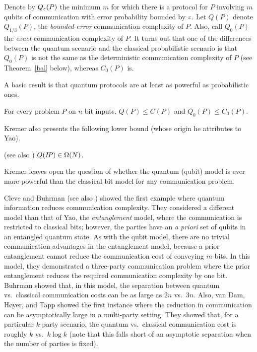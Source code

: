 Denote by $Q_{\varepsilon}(P)$ the minimum $m$ for which there is a protocol for 
$P$ involving $m$ qubits of communication with error probability bounded 
by $\varepsilon$.
Let $Q(P)$ denote $Q_{1/3}(P)$, the {\em bounded-error} communication 
complexity of $P$.
Also, call $Q_0(P)$ the {\em exact} communication complexity of $P$.
It turns out that one of the differences between the quantum scenario 
and the classical probabilistic scenario is that $Q_0(P)$ is not the 
same as the deterministic communication complexity of $P$ (see 
Theorem~\ref{bal} below), whereas $C_0(P)$ is.

A basic result is that quantum protocols are at least as powerful as 
probabilistic ones.

\begin{fact}\cite{Kr95} For every problem $P$ on $n$-bit inputs,
$Q(P) \leq C(P)$ and $Q_0(P) \leq C_0(P)$.
\end{fact}

\ni Kremer also presents the following lower bound (whose origin he 
attributes to Yao).

\begin{theorem}\cite{Kr95} (see also \cite{CDNT97}) \label{thm:lowerboundip}
$Q(\mbox{\it IP\/}) \in \Omega(N)$.
\end{theorem}

\ni Kremer leaves open the question of whether the quantum (qubit) model 
is ever more powerful than the classical bit model for any communication 
problem.

Cleve and Buhrman \cite{CB97} (see also \cite{BCD97}) showed the first example 
where quantum information reduces communication complexity.
They considered a different model than that of Yao, the {\em entanglement\/} 
model, where the communication is restricted to classical bits; however, the 
parties have an {\em a priori} set of qubits in an entangled quantum state.
As with the qubit model, there are no trivial communication advantages 
in the entanglement model, because a prior entanglement cannot reduce 
the communication cost of conveying $m$ bits.
In this model, they demonstrated a three-party communication problem where 
the prior entanglement reduces the required communication complexity by 
one bit.
Buhrman \cite{Bu97} showed that, in this model, the separation between 
quantum vs.\ classical communication costs can be as large as 
$2n$ vs.\ $3n$.
Also, van Dam, H\o yer, and Tapp \cite{DHT97} showed the first instance 
where the reduction in communication can be asymptotically large in a 
multi-party setting.
They showed that, for a particular $k$-party scenario, the quantum vs.\ 
classical communication cost is roughly $k$ vs.\ $k \log k$ 
(note that this falls short of an asymptotic separation when the number 
of parties is fixed).

